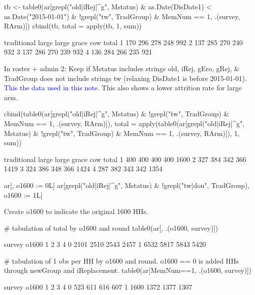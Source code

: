 \begin{Schunk}
\begin{Sinput}
tb <- table0(ar[grepl("old|iRej|^g", Mstatus) 
  & as.Date(DisDate1) < as.Date("2015-01-01") & !grepl("tw", TradGroup) 
  & MemNum == 1, .(survey, RArm)])
cbind(tb, total = apply(tb, 1, sum))
\end{Sinput}
\begin{Soutput}
  traditional large large grace cow total
1         170   296         278 248   992
2         137   285         270 240   932
3         137   286         270 239   932
4         136   284         266 235   921
\end{Soutput}
\end{Schunk}
In \textsf{roster + admin} 2: Keep if \textsf{Mstatus} includes strings old, iRej, gEro, gRej, \& \textsf{TradGroup} does not include strings tw (relaxing  \textsf{DisDate1} is before 2015-01-01). \textcolor{blue}{This the data used in this note.} This also shows a lower attrition rate for \textsf{large} arm. \gobblepars
\begin{Schunk}
\begin{Sinput}
cbind(table0(ar[grepl("old|iRej|^g", Mstatus) & 
  !grepl("tw", TradGroup) & MemNum == 1, .(survey, RArm)]), 
  total = apply(table0(ar[grepl("old|iRej|^g", Mstatus) & 
    !grepl("tw", TradGroup) & MemNum == 1, .(survey, RArm)]), 1, sum))
\end{Sinput}
\begin{Soutput}
  traditional large large grace cow total
1         400   400         400 400  1600
2         327   384         342 366  1419
3         324   386         348 366  1424
4         287   382         343 342  1354
\end{Soutput}
\begin{Sinput}
ar[, o1600 := 0L]
ar[grepl("old|iRej|^g", Mstatus) & !grepl("tw|dou", TradGroup), 
  o1600 := 1L]
\end{Sinput}
\end{Schunk}
Create \textsf{o1600} to indicate the original 1600 HHs.
\begin{Schunk}
\begin{Sinput}
# tabulation of total by o1600 and round
table0(ar[, .(o1600, survey)])
\end{Sinput}
\begin{Soutput}
     survey
o1600    1    2    3    4
    0 2101 2510 2543 2457
    1 6532 5817 5843 5420
\end{Soutput}
\begin{Sinput}
# tabulation of 1 obs per HH by o1600 and round. o1600 == 0 is added HHs through newGroup and iReplacement.
table0(ar[MemNum==1, .(o1600, survey)])
\end{Sinput}
\begin{Soutput}
     survey
o1600    1    2    3    4
    0  523  611  616  607
    1 1600 1372 1377 1307
\end{Soutput}
\end{Schunk}
